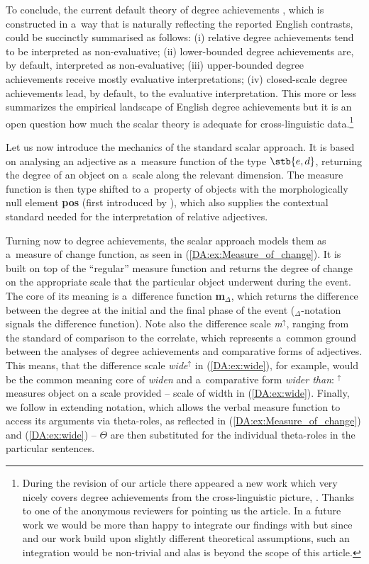 \documentclass[output=paper]{langscibook}
\begin{document}
\noindent To conclude, the current default theory of degree achievements \citep{hay_scalar_1999,kennedy2008measure,kennedy_2012}, which is constructed in a~way that is naturally reflecting the reported English contrasts, could be succinctly summarised as follows: (i) relative degree achievements tend to be interpreted as non-evaluative; (ii) lower-bounded degree achievements are, by default, interpreted as non-eval\-u\-a\-tive; (iii) upper-bounded degree achievements receive mostly evaluative interpretations; (iv) closed-scale degree achievements lead, by default, to the evaluative interpretation.  This more or less summarizes the empirical landscape of English degree achievements but it is an open question how much the scalar theory is adequate for cross-linguistic data.\footnote{During the revision of our article there appeared a new work which very nicely covers degree achievements from the cross-linguistic picture, \citet{martinez_vera_degree_2021}. Thanks to one of the anonymous reviewers for pointing us the article. In a future work we would be more than happy to integrate our findings with \citet{martinez_vera_degree_2021} but since \citet{martinez_vera_degree_2021} and our work build upon slightly different theoretical assumptions, such an integration would be non-trivial and alas is beyond the scope of this article.}  


Let us now introduce the mechanics of the standard scalar approach. It is based on analysing an adjective as a~measure function of the type $\stb{e,d}$, returning the degree of an object on a~scale along the relevant dimension. The measure function is then type shifted to a~property of objects with the morphologically null element \textbf{pos} (first introduced by \citealt{Kennedy1997ComparisonAP}), which also supplies the contextual standard needed for the interpretation of relative adjectives.

Turning now to degree achievements, the scalar approach models them as a~measure of change function, as seen in (\ref{DA:ex:Measure_of_change}). It is built on top of the ``regular'' measure function and returns the degree of change on the appropriate scale that the particular object underwent during the event. The core of its meaning is a~difference function \textbf{m}$_\Delta$, which returns the difference between the degree at the initial and the final phase of the event ($_\Delta$-notation signals the difference function). Note also the difference scale \textit{m}$^\uparrow$, ranging from the standard of comparison to the correlate, which represents a~common ground between the analyses of degree achievements and comparative forms of adjectives. This means, that the difference scale \textit{wide}$^\uparrow$ in (\ref{DA:ex:wide}), for example, would be the common meaning core of \textit{widen} and a~comparative form \textit{wider than}: $^\uparrow$ measures object on a scale provided -- scale of width in (\ref{DA:ex:wide}). Finally, we follow \citet{henderson_quantizing_2013} in extending  notation, which allows the verbal measure function to access its arguments via theta-roles, as reflected in (\ref{DA:ex:Measure_of_change}) and (\ref{DA:ex:wide}) -- $\Theta$ are then substituted for the individual theta-roles in the particular sentences.
\end{document}
